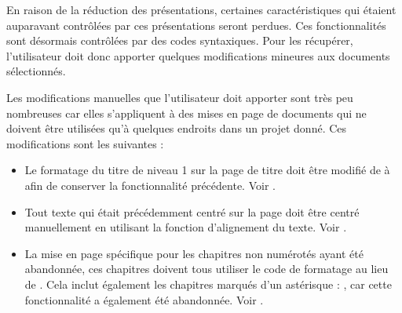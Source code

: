 \documentclass[a4paper,11pt,french]{sphinxmanual}
\begin{document}
\sphinxAtStartPar
En raison de la réduction des présentations, certaines caractéristiques qui étaient auparavant contrôlées par ces présentations seront perdues. Ces fonctionnalités sont désormais contrôlées par des codes syntaxiques. Pour les récupérer, l’utilisateur doit donc apporter quelques modifications mineures aux documents sélectionnés.

\sphinxAtStartPar
Les modifications manuelles que l’utilisateur doit apporter sont très peu nombreuses car elles s’appliquent à des mises en page de documents qui ne doivent être utilisées qu’à quelques endroits dans un projet donné. Ces modifications sont les suivantes :

\sphinxAtStartPar
{}
\begin{itemize}
\item {} 
\sphinxAtStartPar
Le formatage du titre de niveau 1 sur la page de titre doit être modifié de  à  afin de conserver la fonctionnalité précédente. Voir {\hyperref[\detokenize{usage_format:a-fmt-head}]{}}.

\item {} 
\sphinxAtStartPar
Tout texte qui était précédemment centré sur la page doit être centré manuellement en utilisant la fonction d’alignement du texte. Voir {\hyperref[\detokenize{usage_format:a-fmt-align}]{}}.

\end{itemize}

\sphinxAtStartPar
{}
\begin{itemize}
\item {} 
\sphinxAtStartPar
La mise en page spécifique pour les chapitres non numérotés ayant été abandonnée, ces chapitres doivent tous utiliser le code de formatage  au lieu de . Cela inclut également les chapitres marqués d’un astérisque : , car cette fonctionnalité a également été abandonnée. Voir {\hyperref[\detokenize{usage_format:a-fmt-head}]{}}.

\end{itemize}
\end{document}
